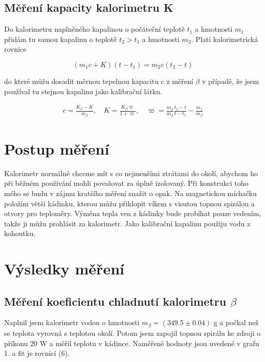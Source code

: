 \documentclass[a4paper,11pt]{article}
\begin{document}
\subsection{Měření kapacity kalorimetru K}

Do kalorimetru naplněného kapalinou o počáteční teplotě $t_1$ a hmotnosti $m_1$ přidám tu samou kapalinu o teplotě $t_2 > t_1$ a hmotnosti $m_2$. Platí kalorimetrická rovnice

\begin{equation}
(m_1c + K)(t-t_1) = m_2c(t_2-t)
\end{equation}

\noindent
do které můžu dosadit měrnou tepelnou kapacitu c z měření $\beta$ v případě, že jsem používal tu stejnou kapalinu jako kalibrační látku.

\begin{align}
  c = \frac{K_{\beta} - K}{m_{\beta}}, \quad K = \frac{K_{\beta} \varpi}{1 + \varpi}, \quad \varpi = \frac{m_2}{m_{\beta}}\frac{t_2 - t}{t - t_1} - \frac{m_1}{m_{\beta}}
\end{align}

\section{Postup měření}

Kalorimetr normálně chceme mít s co nejmenšími ztrátami do okolí, abychom ho při běžném používání mohli považovat za úplně izolovaný. Při konstrukci toho mého se budu v zájmu kratšího měření snažit o opak. Na magnetickou míchačku položím větší kádinku, kterou můžu přiklopit víkem s visutou topnou spirálou a otvory pro teploměry. Výměna tepla ven z kádinky bude probíhat pouze vedením, takže ji můžu prohlásit za kalorimetr. Jako kalibrační kapalinu použiju vodu z kohoutku.

\section{Výsledky měření}

\subsection{Měření koeficientu chladnutí kalorimetru $\beta$}

Naplnil jsem kalorimetr vodou o hmotnosti $m_{\beta} = (349.5 \pm 0.04)$ g a počkal než se teplota vyrovná s teplotou okolí. Potom jsem zapojil topnou spirálu ke zdroji o příkonu 20 W a měřil teplotu v kádince. Naměřené hodnoty jsou uvedené v grafu 1. a fit je rovnicí (6).
\end{document}

